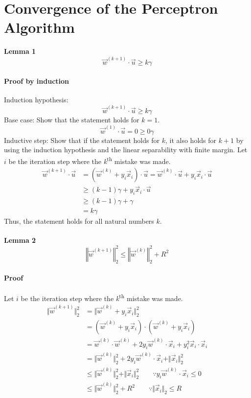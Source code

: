 \section{Convergence of the Perceptron Algorithm}
\paragraph{Lemma 1 
\[
\vec{w}^{(k+1)}\cdot\vec{u}\geq k\gamma
\]
}


\paragraph*{Proof by induction}

Induction hypothesis:
\[
\vec{w}^{(k+1)}\cdot\vec{u}\geq k\gamma
\]
Base case: Show that the statement holds for $k=1$.
\[
\vec{w}^{(1)}\cdot\vec{u}=0\geq0\gamma
\]
Inductive step: Show that if the statement holds for $k$, it also
holds for $k+1$ by using the induction hypothesis and the linear
separability with finite margin. Let $i$ be the iteration step where
the \emph{k}\textsuperscript{th} mistake was made.
\begin{align*}
\vec{w}^{(k+1)}\cdot\vec{u} & =(\vec{w}^{(k)}+y_{i}\vec{x}_{i})\cdot\vec{u}=\vec{w}^{(k)}\cdot\vec{u}+y_{i}\vec{x}_{i}\cdot\vec{u}\\
 & \geq(k-1)\gamma+y_{i}\vec{x}_{i}\cdot\vec{u}\\
 & \geq(k-1)\gamma+\gamma\\
 & =k\gamma
\end{align*}
Thus, the statement holds for all natural numbers $k$.


\paragraph*{Lemma 2
\[
\left\Vert \vec{w}^{(k+1)}\right\Vert _{2}^{2}\leq\left\Vert \vec{w}^{(k)}\right\Vert _{2}^{2}+R^{2}
\]
}


\paragraph*{Proof}

Let $i$ be the iteration step where the \emph{k}\textsuperscript{th}
mistake was made.
\begin{align*}
\Vert\vec{w}^{(k+1)}\Vert_{2}^{2} & =\Vert\vec{w}^{(k)}+y_{i}\vec{x}_{i}\Vert_{2}^{2}\\
 & =\left(\vec{w}^{(k)}+y_{i}\vec{x}_{i}\right)\cdot\left(\vec{w}^{(k)}+y_{i}\vec{x}_{i}\right)\\
 & =\vec{w}^{(k)}\cdot\vec{w}^{(k)}+2y_{i}\vec{w}^{(k)}\cdot\vec{x}_{i}+y_{i}^{2}\vec{x}_{i}\cdot\vec{x}_{i}\\
 & =\Vert\vec{w}^{(k)}\Vert_{2}^{2}+2y_{i}\vec{w}^{(k)}\cdot\vec{x}_{i}+\Vert\vec{x}_{i}\Vert_{2}^{2}\\
 & \leq\Vert\vec{w}^{(k)}\Vert_{2}^{2}+\Vert\vec{x}_{i}\Vert_{2}^{2}\qquad\because y_{i}\vec{w}^{(k)}\cdot\vec{x}_{i}\leq0\\
 & \leq\Vert\vec{w}^{(k)}\Vert_{2}^{2}+R^{2}\qquad\because\Vert\vec{x}_{i}\Vert_{2}\leq R
\end{align*}



